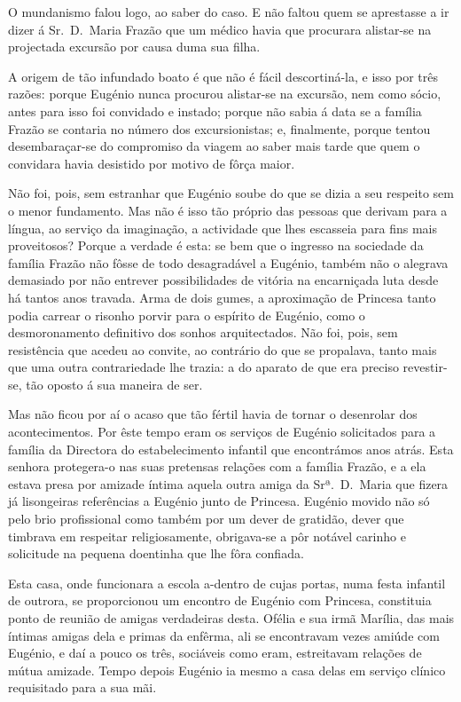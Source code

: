 \documentclass[9pt]{article}
\begin{document}
O mundanismo falou logo, ao saber do caso. E não faltou quem se aprestasse a ir dizer á Sr.\ D.\ Maria Frazão que um médico havia que procurara
alistar-se na projectada excursão por causa duma sua fi\-lha.

A origem de tão infundado boato é que não é fácil descortiná-la, e
isso por três razões: porque Eugé\-nio nunca procurou alistar-se na excursão, nem como sócio, antes para isso foi convidado e instado; porque não
sabia á data se a fa\-mí\-lia Frazão se contaria no número dos excur\-sio\-nistas; e, finalmente, porque tentou desembaraçar-se do compromiso da viagem
ao saber mais tarde que quem o convidara havia desistido por motivo de
fôrça maior.

Não foi, pois, sem estranhar que Eugé\-nio soube do que se dizia a seu
respeito sem o menor fundamento. Mas não é isso tão próprio das pessoas
que derivam para a língua, ao serviço da imagina\-ção, a actividade que lhes
escasseia para fins mais proveitosos? Porque a verdade é esta: se bem
que o ingresso na sociedade da fa\-mí\-lia Frazão não fôsse de todo desa\-gra\-dá\-vel a Eugé\-nio, também não o alegrava demasiado por não entrever possibilidades de vitória na encarniçada luta desde há tantos anos travada.
Arma de dois gumes, a aproxima\-ção de Princesa tanto podia carrear o risonho porvir para o espírito de Eugé\-nio, como o desmoronamento definitivo dos sonhos arquitectados. Não foi, pois, sem resistência que acedeu ao convite, ao contrário do que se propalava, tanto mais que uma outra
contrariedade lhe trazia: a do aparato de que era preciso revestir-se,
tão oposto á sua maneira de ser.

Mas não ficou por aí o acaso que tão fértil havia de tornar o desenrolar dos acontecimentos. Por êste tempo eram os serviços de Eugé\-nio solicitados para a fa\-mí\-lia da Directora do estabelecimento infantil que
encontrámos anos atrás. Esta senhora protegera-o nas suas pretensas rela\-ções com a fa\-mí\-lia Frazão, e a ela estava presa por amizade íntima aquela outra amiga da Srª.\ D.\ Maria que fizera já lisongeiras referências
a Eugé\-nio junto de Princesa. Eugé\-nio movido não só pelo brio profis\-sio\-nal como também por um dever de gratidão, dever que
timbrava em respeitar religiosamente, obrigava-se a pôr notável carinho
e solicitude na pequena doentinha que lhe fôra confiada.

Esta casa, onde funcionara a escola a-dentro de cujas portas, numa
festa infantil de outrora, se proporcionou um encontro de Eugé\-nio com
Princesa, constituia ponto de reunião de amigas verdadeiras desta. Ofé\-lia
e sua irmã Marília, das mais íntimas amigas dela e primas da enfêr\-ma, ali
se encontravam vezes amiúde com Eugé\-nio, e daí a pouco os três, sociáveis
como eram, estreitavam rela\-ções de mútua amizade. Tem\-po depois Eugé\-nio
ia mesmo a casa delas em serviço clínico requisitado para a sua mãi.
\end{document}
